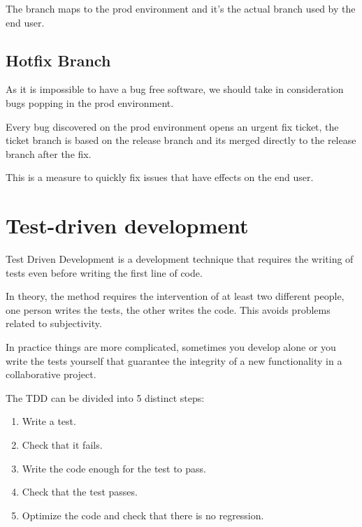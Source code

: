 \begin{spacing}{1.2}
The branch maps to the prod environment and it's the actual branch used by the end user.
\subsection{Hotfix Branch}
As it is impossible to have a bug free software, we should take in consideration bugs popping in the prod environment.

Every bug discovered on the prod environment opens an urgent fix ticket, the ticket branch is based on the release branch and its merged directly to the release branch after the fix.

This is a measure to quickly fix issues that have effects on the end user.
\section{Test-driven development}
Test Driven Development is a development technique that requires the writing of tests even before writing the first line of code.

In theory, the method requires the intervention of at least two different people, one person writes the tests, the other writes the code. This avoids problems related to subjectivity.

In practice things are more complicated, sometimes you develop alone or you write the tests yourself that guarantee the integrity of a new functionality in a collaborative project.

The TDD can be divided into 5 distinct steps:
\begin{enumerate}
	\item  Write a test.
	\item Check that it fails.
	\item Write the code enough for the test to pass.
	\item Check that the test passes.
	\item Optimize the code and check that there is no regression.
\end{enumerate}


\end{spacing}
